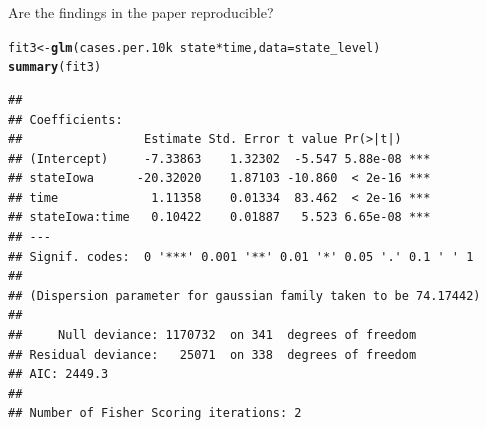 \documentclass[10pt]{beamer}\usepackage[]{graphicx}\usepackage[]{color}
\makeatletter
\def\maxwidth{ %
  \ifdim\Gin@nat@width>\linewidth
    \linewidth
  \else
    \Gin@nat@width
  \fi
}
\newcommand{\hlstr}[1]{\textcolor[rgb]{0.192,0.494,0.8}{#1}}%
\newcommand{\hlopt}[1]{\textcolor[rgb]{0,0,0}{#1}}%
\newcommand{\hlstd}[1]{\textcolor[rgb]{0.345,0.345,0.345}{#1}}%
\newcommand{\hlkwb}[1]{\textcolor[rgb]{0.69,0.353,0.396}{#1}}%
\newcommand{\hlkwc}[1]{\textcolor[rgb]{0.333,0.667,0.333}{#1}}%
\newcommand{\hlkwd}[1]{\textcolor[rgb]{0.737,0.353,0.396}{\textbf{#1}}}%
\newenvironment{kframe}{%
 \def\at@end@of@kframe{}%
 \ifinner\ifhmode%
  \def\at@end@of@kframe{\end{minipage}}%
  \begin{minipage}{\columnwidth}%
 \fi\fi%
 \def\FrameCommand##1{\hskip\@totalleftmargin \hskip-\fboxsep
 \colorbox{shadecolor}{##1}\hskip-\fboxsep
     \hskip-\linewidth \hskip-\@totalleftmargin \hskip\columnwidth}%
 \MakeFramed {\advance\hsize-\width
   \@totalleftmargin\z@ \linewidth\hsize
   \@setminipage}}%
 {\par\unskip\endMakeFramed%
 \at@end@of@kframe}
\newenvironment{knitrout}{}{} %
\makeatother
\begin{document}
\begin{frame}[fragile]{Are the findings in the paper reproducible?}
	
\begin{knitrout}\tiny
{}\color{fgcolor}\begin{kframe}
\begin{alltt}
\hlstd{fit3} \hlkwb{<-} \hlkwd{glm}\hlstd{(cases.per.10k} \hlopt{~} \hlstd{state}\hlopt{*}\hlstd{time,} \hlkwc{data} \hlstd{= state_level)}
\hlkwd{summary}\hlstd{(fit3)}
\end{alltt}
\begin{verbatim}
## 
## Coefficients:
##                 Estimate Std. Error t value Pr(>|t|)    
## (Intercept)     -7.33863    1.32302  -5.547 5.88e-08 ***
## stateIowa      -20.32020    1.87103 -10.860  < 2e-16 ***
## time             1.11358    0.01334  83.462  < 2e-16 ***
## stateIowa:time   0.10422    0.01887   5.523 6.65e-08 ***
## ---
## Signif. codes:  0 '***' 0.001 '**' 0.01 '*' 0.05 '.' 0.1 ' ' 1
## 
## (Dispersion parameter for gaussian family taken to be 74.17442)
## 
##     Null deviance: 1170732  on 341  degrees of freedom
## Residual deviance:   25071  on 338  degrees of freedom
## AIC: 2449.3
## 
## Number of Fisher Scoring iterations: 2
\end{verbatim}
\end{kframe}
\end{knitrout}
	
\end{frame}


\end{document}
